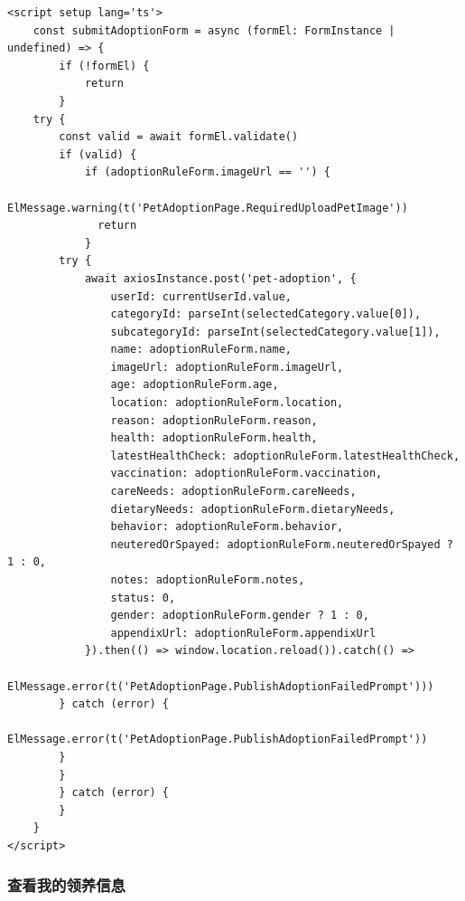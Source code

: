 \begin{itemize}
	\begin{verbatim}
<script setup lang='ts'>
	const submitAdoptionForm = async (formEl: FormInstance | undefined) => {
		if (!formEl) {
			return
		}
	try {
		const valid = await formEl.validate()
		if (valid) {
			if (adoptionRuleForm.imageUrl == '') {
			  ElMessage.warning(t('PetAdoptionPage.RequiredUploadPetImage'))
			  return
			}
		try {
			await axiosInstance.post('pet-adoption', {
				userId: currentUserId.value,
				categoryId: parseInt(selectedCategory.value[0]),
				subcategoryId: parseInt(selectedCategory.value[1]),
				name: adoptionRuleForm.name,
				imageUrl: adoptionRuleForm.imageUrl,
				age: adoptionRuleForm.age,
				location: adoptionRuleForm.location,
				reason: adoptionRuleForm.reason,
				health: adoptionRuleForm.health,
				latestHealthCheck: adoptionRuleForm.latestHealthCheck,
				vaccination: adoptionRuleForm.vaccination,
				careNeeds: adoptionRuleForm.careNeeds,
				dietaryNeeds: adoptionRuleForm.dietaryNeeds,
				behavior: adoptionRuleForm.behavior,
				neuteredOrSpayed: adoptionRuleForm.neuteredOrSpayed ? 1 : 0,
				notes: adoptionRuleForm.notes,
				status: 0,
				gender: adoptionRuleForm.gender ? 1 : 0,
				appendixUrl: adoptionRuleForm.appendixUrl
			}).then(() => window.location.reload()).catch(() =>
			ElMessage.error(t('PetAdoptionPage.PublishAdoptionFailedPrompt')))
		} catch (error) {
			ElMessage.error(t('PetAdoptionPage.PublishAdoptionFailedPrompt'))
		}
		}
		} catch (error) {
		}
	}
</script>
	\end{verbatim}
\end{itemize}

\subsubsection{查看我的领养信息}

